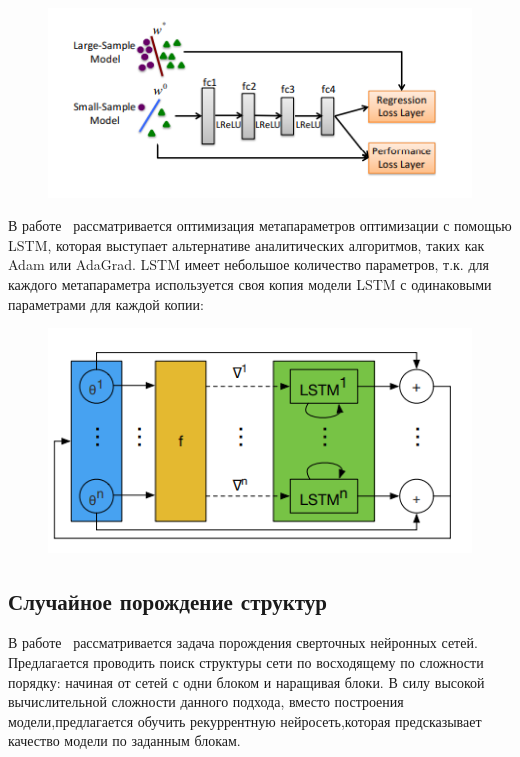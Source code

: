 \begin{figure}[H]
\includegraphics[width=\textwidth]{./plots/arch_review_figs/l2l_scheme.png}
\end{figure}

В работе~\cite{l2l_by_gd_gd} рассматривается оптимизация метапараметров оптимизации с помощью LSTM, которая выступает альтернативе аналитических алгоритмов, таких как Adam или AdaGrad. LSTM имеет небольшое количество параметров, т.к. для каждого метапараметра используется своя копия модели LSTM с одинаковыми параметрами для каждой копии:
\begin{figure}[H]
\includegraphics[width=\textwidth]{./plots/arch_review_figs/l2lbygd.png}
\end{figure}




\subsection{Случайное порождение структур}
В работе~\cite{search_smbo} рассматривается задача порождения сверточных нейронных сетей. Предлагается проводить поиск структуры сети по восходящему по сложности порядку: начиная от сетей с одни блоком и наращивая блоки. В силу высокой вычислительной сложности данного подхода, вместо построения модели,предлагается обучить рекуррентную нейросеть,которая предсказывает качество модели по заданным блокам. 


